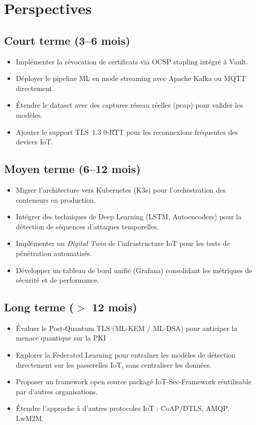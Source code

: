 \section{Perspectives}

\subsection{Court terme (3--6 mois)}

\begin{itemize}
  \item Implémenter la révocation de certificats via OCSP stapling intégré à Vault.
  \item Déployer le pipeline ML en mode streaming avec Apache Kafka ou MQTT directement.
  \item Étendre le dataset avec des captures réseau réelles (pcap) pour valider les modèles.
  \item Ajouter le support TLS~1.3 0-RTT pour les reconnexions fréquentes des devices IoT.
\end{itemize}

\subsection{Moyen terme (6--12 mois)}

\begin{itemize}
  \item Migrer l'architecture vers Kubernetes (K3s) pour l'orchestration des conteneurs en production.
  \item Intégrer des techniques de Deep Learning (LSTM, Autoencoders) pour la détection de séquences d'attaques temporelles.
  \item Implémenter un \textit{Digital Twin} de l'infrastructure IoT pour les tests de pénétration automatisés.
  \item Développer un tableau de bord unifié (Grafana) consolidant les métriques de sécurité et de performance.
\end{itemize}

\subsection{Long terme ($>$ 12 mois)}

\begin{itemize}
  \item Évaluer le Post-Quantum TLS (ML-KEM / ML-DSA) pour anticiper la menace quantique sur la PKI~\cite{rfc9325}.
  \item Explorer la Federated Learning pour entraîner les modèles de détection directement sur les passerelles IoT, sans centraliser les données.
  \item Proposer un framework open source packagé \og IoT-Sec-Framework \fg{} réutilisable par d'autres organisations.
  \item Étendre l'approche à d'autres protocoles IoT : CoAP/DTLS, AMQP, LwM2M.
\end{itemize}

